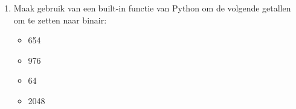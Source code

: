 \begin{enumerate}
\item Maak gebruik van een built-in functie van Python om de volgende getallen om te zetten naar binair:
	\begin{itemize}
	\item 654
	\item 976
	\item 64
	\item 2048
	\end{itemize}
\end{enumerate}

